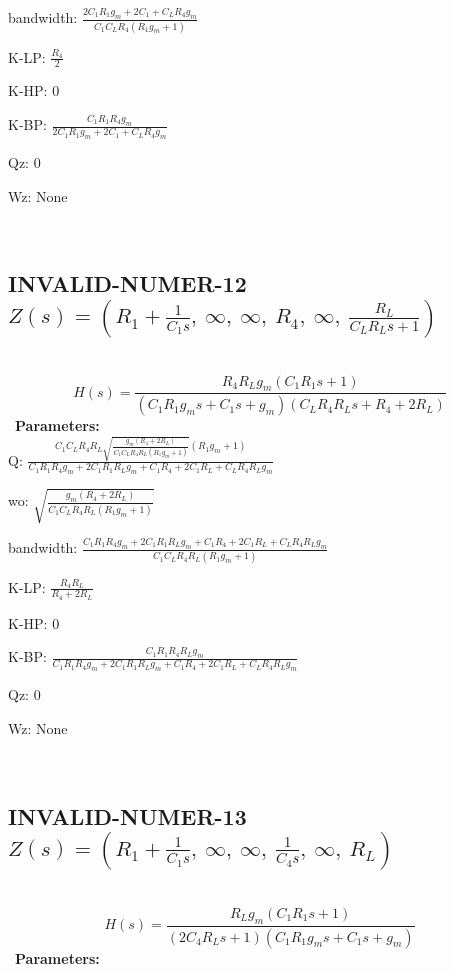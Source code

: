 \documentclass{article}
\begin{document}
bandwidth: $\frac{2 C_{1} R_{1} g_{m} + 2 C_{1} + C_{L} R_{4} g_{m}}{C_{1} C_{L} R_{4} \left(R_{1} g_{m} + 1\right)}$\ 

K-LP: $\frac{R_{4}}{2}$\ 

K-HP: $0$\ 

K-BP: $\frac{C_{1} R_{1} R_{4} g_{m}}{2 C_{1} R_{1} g_{m} + 2 C_{1} + C_{L} R_{4} g_{m}}$\ 

Qz: $0$\ 

Wz: $\text{None}$\ 

\ 

\subsection{INVALID-NUMER-12 $Z(s) = \left( R_{1} + \frac{1}{C_{1} s}, \  \infty, \  \infty, \  R_{4}, \  \infty, \  \frac{R_{L}}{C_{L} R_{L} s + 1}\right)$ } \ 
\textbf{\[H(s) = \frac{R_{4} R_{L} g_{m} \left(C_{1} R_{1} s + 1\right)}{\left(C_{1} R_{1} g_{m} s + C_{1} s + g_{m}\right) \left(C_{L} R_{4} R_{L} s + R_{4} + 2 R_{L}\right)}\] } \ 
\textbf{Parameters:}\\ 

Q: $\frac{C_{1} C_{L} R_{4} R_{L} \sqrt{\frac{g_{m} \left(R_{4} + 2 R_{L}\right)}{C_{1} C_{L} R_{4} R_{L} \left(R_{1} g_{m} + 1\right)}} \left(R_{1} g_{m} + 1\right)}{C_{1} R_{1} R_{4} g_{m} + 2 C_{1} R_{1} R_{L} g_{m} + C_{1} R_{4} + 2 C_{1} R_{L} + C_{L} R_{4} R_{L} g_{m}}$\ 

wo: $\sqrt{\frac{g_{m} \left(R_{4} + 2 R_{L}\right)}{C_{1} C_{L} R_{4} R_{L} \left(R_{1} g_{m} + 1\right)}}$\ 

bandwidth: $\frac{C_{1} R_{1} R_{4} g_{m} + 2 C_{1} R_{1} R_{L} g_{m} + C_{1} R_{4} + 2 C_{1} R_{L} + C_{L} R_{4} R_{L} g_{m}}{C_{1} C_{L} R_{4} R_{L} \left(R_{1} g_{m} + 1\right)}$\ 

K-LP: $\frac{R_{4} R_{L}}{R_{4} + 2 R_{L}}$\ 

K-HP: $0$\ 

K-BP: $\frac{C_{1} R_{1} R_{4} R_{L} g_{m}}{C_{1} R_{1} R_{4} g_{m} + 2 C_{1} R_{1} R_{L} g_{m} + C_{1} R_{4} + 2 C_{1} R_{L} + C_{L} R_{4} R_{L} g_{m}}$\ 

Qz: $0$\ 

Wz: $\text{None}$\ 

\ 

\subsection{INVALID-NUMER-13 $Z(s) = \left( R_{1} + \frac{1}{C_{1} s}, \  \infty, \  \infty, \  \frac{1}{C_{4} s}, \  \infty, \  R_{L}\right)$ } \ 
\textbf{\[H(s) = \frac{R_{L} g_{m} \left(C_{1} R_{1} s + 1\right)}{\left(2 C_{4} R_{L} s + 1\right) \left(C_{1} R_{1} g_{m} s + C_{1} s + g_{m}\right)}\] } \ 
\textbf{Parameters:}\\ 
\end{document}
